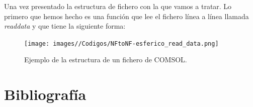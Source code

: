 \documentclass{article}
\begin{document}
\newpage

Una vez presentado la estructura de fichero con la que vamos a tratar. Lo primero que hemos hecho es una función que lee el fichero línea a línea llamada 
\textit{read\textunderscore{}data} y que tiene la siguiente forma:

\begin{figure}[h]
  \centering
    \texttt{[image: images//Codigos/NFtoNF-esferico\_read\_data.png]}
    \caption{Ejemplo de la estructura de un fichero de COMSOL.}
    \label{Ejemplo fichero COMSOL}
\end{figure}

\newpage
\section{Bibliografía}
\printbibliography
\end{document}

